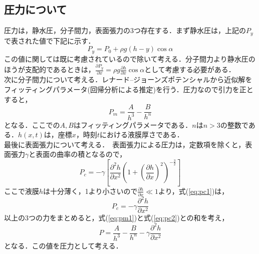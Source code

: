 \documentclass[autodetect-engine,dvipdfmx-if-dvi,ja=standard,a4paper,11pt]{bxjsarticle} %
\begin{document}
\subsection{圧力について}
圧力は，静水圧，分子間力，表面張力の3つ存在する．まず静水圧は，上記の$P_y$で表された値で下記に示す．　
\begin{equation}
P_y=P_0+\rho g(h-y)\cos\alpha
\end{equation}
この値に関しては既に考慮されているので除いて考える．分子間力より静水圧のほうが支配的であるときは，$\frac{\partial P_y}{\partial x}=\rho g\frac{\partial h}{\partial x}\cos\alpha$として考慮する必要がある．\\
\　次に分子間力について考える．レナード--ジョーンズポテンシャルから近似解をフィッティングパラメータ(回帰分析による推定)を行う．圧力なので引力を正とすると，
\begin{equation}
P_m=\frac{A}{h^3}-\frac{B}{h^n}
\label{eq:pm1}
\end{equation}
となる．ここでの$A,B$はフィッティングパラメータである．$n$は$n>3$の整数である．$h(x,t)$は，座標$x$，時刻$t$における液膜厚さである．\\
\　最後に表面張力について考える．　表面張力による圧力は，定数項を除くと，表面張力$\gamma$と表面の曲率の積となるので，
\begin{equation}
P_c=-\gamma \left[\frac{\partial^2 h}{\partial x^2}\left(1+\left(\frac{\partial h}{\partial x}\right)^2\right)^{-\frac{3}{2}}\right]
\label{eq:pc1}
\end{equation}
ここで液膜$h$は十分薄く，1より小さいので$\frac{\partial h}{\partial x}\ll 1$より，式(\ref{eq:pc1})は，
\begin{equation}
P_c=-\gamma\frac{\partial^2 h}{\partial x^2}
\label{eq:pc2}
\end{equation}
\　以上の3つの力をまとめると，式(\ref{eq:pm1})と式(\ref{eq:pc2})との和を考え，
\begin{equation}
P=\frac{A}{h^3}-\frac{B}{h^n}-\gamma\frac{\partial^2 h}{\partial x^2}
\label{eq:pall}
\end{equation}
となる．この値を圧力として考える．
\end{document}
